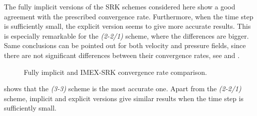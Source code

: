 The fully implicit versions of the SRK schemes considered here show a good agreement with the prescribed convergence rate. Furthermore, when the time step is sufficiently small, the explicit version seems to give more accurate results. This is especially remarkable for the \textit{(2-2/1)} scheme, where the differences are bigger. Same conclusions can be pointed out for both velocity and pressure fields, since there are not significant differences between their convergence rates, see  and  . 
\begin{figure}[h!]
  \centering
  \caption{Fully implicit and IMEX-SRK convergence rate comparison.}
  \label{fig-IMEX_RK_cyl_conv_impl_expl}
\end{figure}
 shows that the \textit{(3-3)} scheme is the most accurate one. Apart from the \textit{(2-2/1)} scheme, implicit and explicit versions give similar results when the time step is sufficiently small. 


